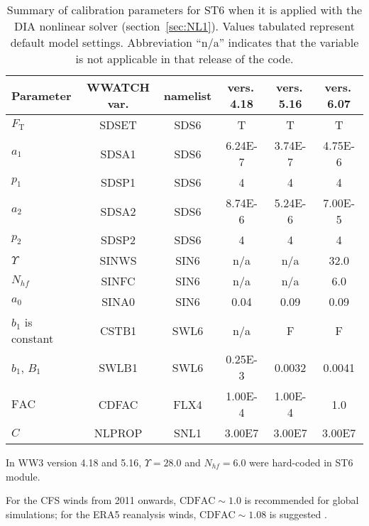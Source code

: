 \begin{table} \begin{center}
\footnotesize
\begin{threeparttable}
\begin{tabular}{|l|c|c|c|c|c|} \hline \hline
Parameter          &  WWATCH var. & namelist &  vers.\,4.18 & vers.\,5.16 & vers.\,6.07 \\
\hline
  $F_{\mathrm{T}}$ &  SDSET       & SDS6     &  T       &  T         & T          \\
  $a_1$            &  SDSA1       & SDS6     & 6.24E-7  & 3.74E-7    & 4.75E-6    \\
  $p_1$            &  SDSP1       & SDS6     &  4       &  4         & 4          \\
  $a_2$            &  SDSA2       & SDS6     & 8.74E-6  & 5.24E-6    & 7.00E-5    \\
  $p_2$            &  SDSP2       & SDS6     &  4       &  4         & 4          \\
\hline
  $\Upsilon$\tnote{\textdagger}       &  SINWS       & SIN6     & n/a      & n/a        & 32.0       \\
  $N_{hf}$\tnote{\textdagger}         &  SINFC       & SIN6     & n/a      & n/a        & 6.0        \\
  $a_0$            &  SINA0       & SIN6     & 0.04     & 0.09       & 0.09       \\
  $b_1$ is constant&  CSTB1       & SWL6     & n/a      &  F         & F          \\
  $b_1$, $B_1$     &  SWLB1       & SWL6     & 0.25E-3  & 0.0032     & 0.0041     \\
  $\mathrm{FAC}$   &  CDFAC       & FLX4     & 1.00E-4  & 1.00E-4    & 1.0\tnote{\textdaggerdbl}        \\
\hline
  $C$              &  NLPROP      & SNL1     & 3.00E7   &  3.00E7    & 3.00E7    \\
 \hline \hline
\end{tabular}
\begin{tablenotes}
	\item[\textdagger] In WW3 version 4.18 and 5.16, $\Upsilon = 28.0$
            and $N_{hf} = 6.0$ were hard-coded in {\code ST6} module.
    \item[\textdaggerdbl] For the CFS winds from 2011 onwards, $\mathrm{CDFAC} \sim 1.0$
            is recommended for global simulations; for the ERA5 reanalysis winds,
            $\mathrm{CDFAC} \sim 1.08$ is suggested \citep{Liu2019, Liu2021}.
\end{tablenotes}
\end{threeparttable} \end{center}
\caption{Summary of calibration parameters for {\code ST6} when it is applied with
         the {\code DIA} nonlinear solver (section~\ref{sec:NL1}). Values tabulated represent default model settings.
         Abbreviation ``n/a'' indicates that the variable is not applicable
         in that release of the code.}
\label{tab:ST601} \botline \end{table}

